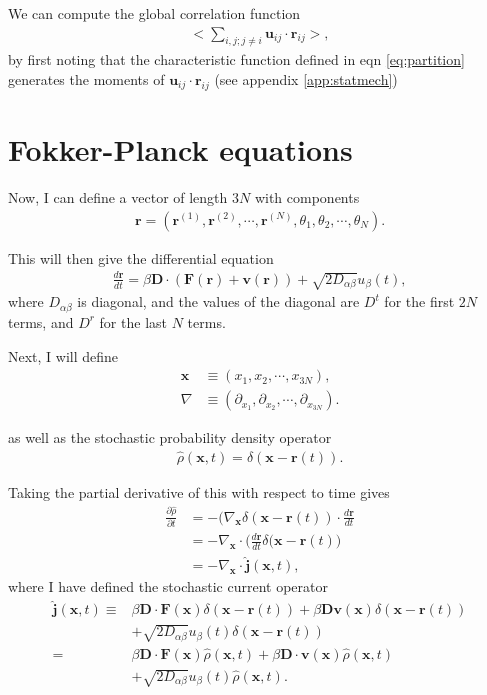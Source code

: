 \documentclass[twocolumn,amsmath,amssymb,aps]{revtex4-1}%
\begin{document}
We can compute the global correlation function
\begin{align}
  \bigg<\sum_{i,j;j\neq i} \bm{u}_{ij}\cdot\bm{r}_{ij}
  \bigg>,
\end{align}
by first noting that the characteristic function defined in eqn
\ref{eq:partition} generates the moments of
$\bm{u}_{ij}\cdot\bm{r}_{ij}$ (see appendix \ref{app:statmech})



\appendix

\section{Fokker-Planck equations\label{app:fokkerplanck}}

Now, I can define a vector of length $3N$ with components
\begin{align}
  \bm{r}=(\bm{r}^{(1)},\bm{r}^{(2)},\cdots,\bm{r}^{(N)},\theta_1,\theta_2,\cdots,
  \theta_N).
\end{align}

This will then give the differential equation
\begin{align}
  \frac{d\bm{r}}{dt}=\beta\bm{D}\cdot(\bm{F}(\bm{r})+\bm{v}(\bm{r}))
  +\sqrt{2D_{\alpha\beta}}u_{\beta}(t),
\end{align}
where $D_{\alpha\beta}$ is diagonal, and the values of the diagonal are
$D^t$ for the first $2N$ terms, and $D^r$ for the last $N$ terms.

Next, I will define
\begin{align}
  \bm{x}&\equiv(x_1,x_2,\cdots,x_{3N}),\\
  \nabla&\equiv(\partial_{x_1},\partial_{x_2},\cdots,\partial_{x_{3N}}).
\end{align}

as well as the stochastic probability density operator
\begin{align}
  \hat{\rho}(\bm{x},t)=\delta(\bm{x}-\bm{r}(t)).
\end{align}

Taking the partial derivative of this with respect to time gives
\begin{align}
  \frac{\partial\hat{\rho}}{\partial t}
  &=-(\nabla_{\bm{x}}\delta(\bm{x}-\bm{r}(t))
  \cdot\frac{d\bm{r}}{dt}\nonumber\\
  &=-\nabla_{\bm{x}}\cdot\bigg(\frac{d\bm{r}}{dt}
  \delta(\bm{x}-\bm{r}(t)\bigg)\nonumber\\
  &=-\nabla_{\bm{x}}\cdot\hat{\bm{j}}(\bm{x},t),
\end{align}
where I have defined the stochastic current operator
\begin{align}
  \hat{\bm{j}}(\bm{x},t)\equiv
  &\beta\bm{D}\cdot\bm{F}(\bm{x})\delta(\bm{x}-\bm{r}(t))
  +\beta\bm{D}\bm{v}(\bm{x})\delta(\bm{x}-\bm{r}(t))\nonumber\\
  &+\sqrt{2D_{\alpha\beta}}u_{\beta}(t)
  \delta(\bm{x}-\bm{r}(t))\nonumber\\
  =&\beta\bm{D}\cdot\bm{F}(\bm{x})\hat{\rho}(\bm{x},t)
  +\beta\bm{D}\cdot\bm{v}(\bm{x})\hat{\rho}(\bm{x},t)\nonumber\\
  &+\sqrt{2D_{\alpha\beta}}u_{\beta}(t)\hat{\rho}(\bm{x},t).
\end{align}
\end{document}

